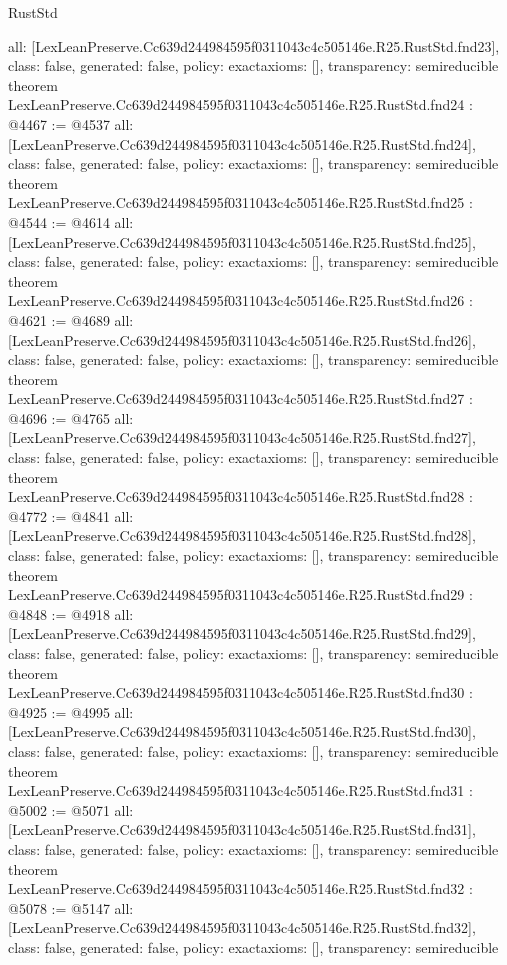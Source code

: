 \begin{lexlean}{RustStd}
\begin{coremodule}
{  all: [LexLeanPreserve.Cc639d244984595f0311043c4c505146e.R25.RustStd.fnd23],
  class: false,
  generated: false,
  policy: exact{axioms: []},
  transparency: semireducible
}
theorem LexLeanPreserve.Cc639d244984595f0311043c4c505146e.R25.RustStd.fnd24 : @4467 := @4537 {
  all: [LexLeanPreserve.Cc639d244984595f0311043c4c505146e.R25.RustStd.fnd24],
  class: false,
  generated: false,
  policy: exact{axioms: []},
  transparency: semireducible
}
theorem LexLeanPreserve.Cc639d244984595f0311043c4c505146e.R25.RustStd.fnd25 : @4544 := @4614 {
  all: [LexLeanPreserve.Cc639d244984595f0311043c4c505146e.R25.RustStd.fnd25],
  class: false,
  generated: false,
  policy: exact{axioms: []},
  transparency: semireducible
}
theorem LexLeanPreserve.Cc639d244984595f0311043c4c505146e.R25.RustStd.fnd26 : @4621 := @4689 {
  all: [LexLeanPreserve.Cc639d244984595f0311043c4c505146e.R25.RustStd.fnd26],
  class: false,
  generated: false,
  policy: exact{axioms: []},
  transparency: semireducible
}
theorem LexLeanPreserve.Cc639d244984595f0311043c4c505146e.R25.RustStd.fnd27 : @4696 := @4765 {
  all: [LexLeanPreserve.Cc639d244984595f0311043c4c505146e.R25.RustStd.fnd27],
  class: false,
  generated: false,
  policy: exact{axioms: []},
  transparency: semireducible
}
theorem LexLeanPreserve.Cc639d244984595f0311043c4c505146e.R25.RustStd.fnd28 : @4772 := @4841 {
  all: [LexLeanPreserve.Cc639d244984595f0311043c4c505146e.R25.RustStd.fnd28],
  class: false,
  generated: false,
  policy: exact{axioms: []},
  transparency: semireducible
}
theorem LexLeanPreserve.Cc639d244984595f0311043c4c505146e.R25.RustStd.fnd29 : @4848 := @4918 {
  all: [LexLeanPreserve.Cc639d244984595f0311043c4c505146e.R25.RustStd.fnd29],
  class: false,
  generated: false,
  policy: exact{axioms: []},
  transparency: semireducible
}
theorem LexLeanPreserve.Cc639d244984595f0311043c4c505146e.R25.RustStd.fnd30 : @4925 := @4995 {
  all: [LexLeanPreserve.Cc639d244984595f0311043c4c505146e.R25.RustStd.fnd30],
  class: false,
  generated: false,
  policy: exact{axioms: []},
  transparency: semireducible
}
theorem LexLeanPreserve.Cc639d244984595f0311043c4c505146e.R25.RustStd.fnd31 : @5002 := @5071 {
  all: [LexLeanPreserve.Cc639d244984595f0311043c4c505146e.R25.RustStd.fnd31],
  class: false,
  generated: false,
  policy: exact{axioms: []},
  transparency: semireducible
}
theorem LexLeanPreserve.Cc639d244984595f0311043c4c505146e.R25.RustStd.fnd32 : @5078 := @5147 {
  all: [LexLeanPreserve.Cc639d244984595f0311043c4c505146e.R25.RustStd.fnd32],
  class: false,
  generated: false,
  policy: exact{axioms: []},
  transparency: semireducible
}
\end{coremodule}
\end{lexlean}
